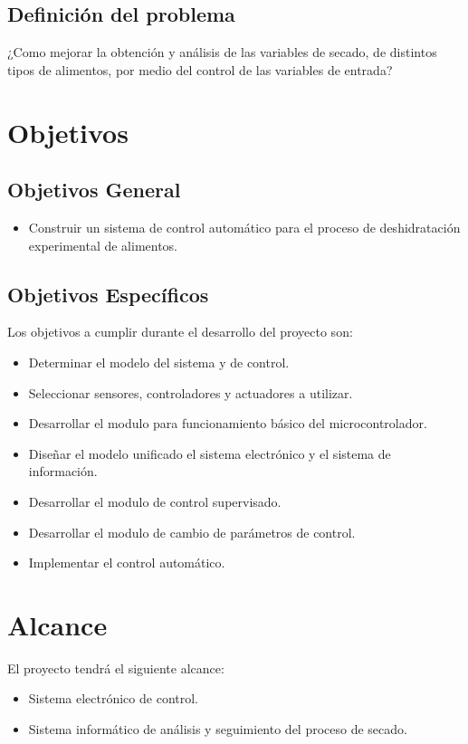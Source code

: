\subsection{Definición del problema}

¿Como mejorar la obtención y análisis de las variables de secado, de distintos
tipos de alimentos, por medio del control de las variables de entrada?

\section{Objetivos}

\subsection{Objetivos General}
\begin{itemize}
  \item Construir un sistema de control automático para el proceso de
        deshidratación experimental de alimentos.

\end{itemize}

\subsection{Objetivos Específicos}
Los objetivos a cumplir durante el desarrollo del proyecto son:
\begin{itemize}
  \item Determinar el modelo del sistema y de control.
  \item Seleccionar sensores, controladores y actuadores a utilizar.
  \item Desarrollar el modulo para funcionamiento básico del microcontrolador.
  \item Diseñar el modelo unificado el sistema electrónico y el sistema de
        información.
  \item Desarrollar el modulo de control supervisado.
  \item Desarrollar el modulo de cambio de parámetros de control.
  \item Implementar el control automático.
\end{itemize}

\section{Alcance}
El proyecto tendrá el siguiente alcance:
\begin{itemize}
  \item Sistema electrónico de control.
  \item Sistema informático de análisis y seguimiento del proceso de secado.
\end{itemize}

